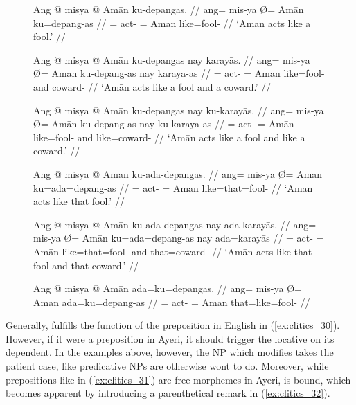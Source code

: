 \begin{figure}[h]
\pex\label{ex:clitics_30}
\a\label{ex:clitics_30a}\begingl
	\gla Ang @ misya {} @ Amān ku-depangas. //
	\glb ang= mis-ya Ø= Amān ku=depang-as //
	\glc \AgtT{}= act-\TsgM{} \Top{}= Amān like=fool-\Parg{} //
	\glft `Amān acts like a fool.' //
\endgl

\a\label{ex:clitics_30b}\begingl
	\gla Ang @ misya {} @ Amān ku-depangas nay karayās. //
	\glb ang= mis-ya Ø= Amān ku-depang-as nay karaya-as //
	\glc \AgtT{}= act-\TsgM{} \Top{}= Amān like=fool-\Parg{} and 
		coward-\Parg{} //
	\glft `Amān acts like a fool and a coward.' //
\endgl

\a\label{ex:clitics_30c}\begingl
	\gla Ang @ misya {} @ Amān ku-depangas nay ku-karayās. //
	\glb ang= mis-ya Ø= Amān ku-depang-as nay ku-karaya-as //
	\glc \AgtT{}= act-\TsgM{} \Top{}= Amān like=fool-\Parg{} and 
		like=coward-\Parg{}	//
	\glft `Amān acts like a fool and like a coward.' //
\endgl

\a\label{ex:clitics_30d}\begingl
	\gla Ang @ misya {} @ Amān ku-ada-depangas. //
	\glb ang= mis-ya Ø= Amān ku=ada=depang-as //
	\glc \AgtT{}= act-\TsgM{} \Top{}= Amān like=that=fool-\Parg{} //
	\glft `Amān acts like that fool.' //
\endgl

\a\label{ex:clitics_30e}\begingl
	\gla Ang @ misya {} @ Amān ku-ada-depangas nay ada-karayās. //
	\glb ang= mis-ya Ø= Amān ku=ada=depang-as nay ada=karayās //
	\glc \AgtT{}= act-\TsgM{} \Top{}= Amān like=that=fool-\Parg{} and 
		that=coward-\Parg{} //
	\glft `Amān acts like that fool and that coward.' //
\endgl

\a\label{ex:clitics_30f}\ljudge{*}\begingl
	\gla Ang @ misya {} @ Amān ada=ku=depangas. //
	\glb ang= mis-ya Ø= Amān ada=ku=depang-as //
	\glc \AgtT{}= act-\TsgM{} \Top{}= Amān that=like=fool-\Parg{} //
\endgl
\xe
\end{figure}

Generally,  fulfills the function of the preposition 
in English in (\ref{ex:clitics_30}). However, if it were a preposition in
Ayeri, it should trigger the locative on its dependent. In the examples above,
however, the NP which  modifies takes the patient case, like
predicative NPs are otherwise wont to do. Moreover, while prepositions like
 in (\ref{ex:clitics_31}) are free morphemes in Ayeri,
 is bound, which becomes apparent by introducing a parenthetical
remark in (\ref{ex:clitics_32}).

